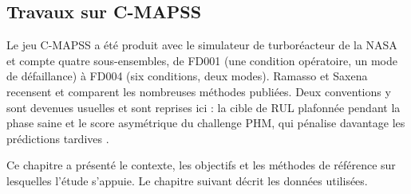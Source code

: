 \subsection{Travaux sur C-MAPSS}\label{sec:ea-cmapss}

Le jeu C-MAPSS a été produit avec le simulateur de turboréacteur de la NASA \cite{saxena2008damage} et compte quatre sous-ensembles, de FD001 (une condition opératoire, un mode de défaillance) à FD004 (six conditions, deux modes). Ramasso et Saxena \cite{ramasso2014} recensent et comparent les nombreuses méthodes publiées. Deux conventions y sont devenues usuelles et sont reprises ici : la cible de RUL plafonnée pendant la phase saine \cite{heimes2008} et le score asymétrique du challenge PHM, qui pénalise davantage les prédictions tardives \cite{saxena2008damage}.

\chapconclusion

Ce chapitre a présenté le contexte, les objectifs et les méthodes de référence sur lesquelles l'étude s'appuie. Le chapitre suivant décrit les données utilisées.
